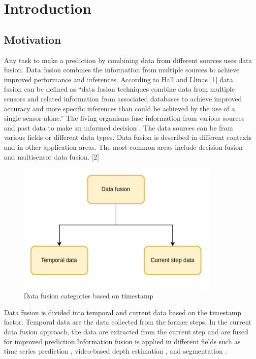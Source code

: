 
    \chapter{Introduction}
	
	\section{Motivation}
		
	Any task to make a prediction by combining data from different sources uses data fusion. Data fusion combines the information from multiple sources to achieve improved performance and inferences. According to Hall and Llinas [1] data fusion can be defined as “data fusion techniques combine data from multiple sensors and related information from associated databases to achieve improved accuracy and more specific inferences than could be achieved by the use of a single sensor alone.” The living organisms fuse information from various sources and past data to make an informed decision \cite{01_mandic2005data}. The data sources can be from various fields or different data types. Data fusion is described in different contexts and in other application areas. The most common areas include decision fusion and multisensor data fusion. [2]
	
	\begin{figure}[h]
		\centering
		\includegraphics[width=10cm]{images/df.png}
		\caption{Data fusion categories based on timestamp}
		\label{fig:3D_reconstruction}
	\end{figure}

	Data fusion is divided into temporal and current data based on the timestamp factor. Temporal data are the data collected from the former steps. In the current data fusion approach, the data are extracted from the current step and are fused for improved prediction.Information fusion is applied in different fields such as time series prediction \cite{02_lim2021temporal}, video-based depth estimation \cite{03_duzceker2021deepvideomvs}, and segmentation \cite{04_li2021spatial}.
	
